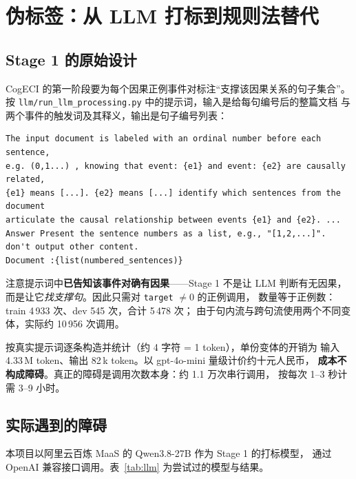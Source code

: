 \section{伪标签：从 LLM 打标到规则法替代}
\label{sec:pseudo}

\subsection{Stage 1 的原始设计}

CogECI 的第一阶段要为每个因果正例事件对标注“支撑该因果关系的句子集合”。
按 \texttt{llm/run\_llm\_processing.py} 中的提示词，输入是给每句编号后的整篇文档
与两个事件的触发词及其释义，输出是句子编号列表：

\begin{lstlisting}
The input document is labeled with an ordinal number before each sentence,
e.g. (0,1...) , knowing that event: {e1} and event: {e2} are causally related,
{e1} means [...]. {e2} means [...] identify which sentences from the document
articulate the causal relationship between events {e1} and {e2}. ...
Answer Present the sentence numbers as a list, e.g., "[1,2,...]". don't output other content.
Document :{list(numbered_sentences)}
\end{lstlisting}

注意提示词中\textbf{已告知该事件对确有因果}——Stage 1 不是让 LLM 判断有无因果，
而是让它\emph{找支撑句}。因此只需对 \texttt{target} $\ne 0$ 的正例调用，
数量等于正例数：train 4\,933 次、dev 545 次，合计 5\,478 次；
由于句内流与跨句流使用两个不同变体，实际约 10\,956 次调用。

按真实提示词逐条构造并统计（约 4 字符 = 1 token），单份变体的开销为
输入 4.33\,M token、输出 82\,k token。以 gpt-4o-mini 量级计价约十元人民币，
\textbf{成本不构成障碍}。真正的障碍是调用次数本身：约 1.1 万次串行调用，
按每次 1--3 秒计需 3--9 小时。

\subsection{实际遇到的障碍}

本项目以阿里云百炼 MaaS 的 Qwen3.8-27B 作为 Stage 1 的打标模型，
通过 OpenAI 兼容接口调用。表~\ref{tab:llm} 为尝试过的模型与结果。

